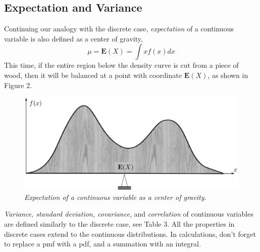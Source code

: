 \subsection{Expectation and Variance}

Continuing our analogy with the discrete case, \textit{expectation} of a continuous variable is also defined as a center of gravity,
\begin{equation*}
  \mu = \mathbf{E}(X) = \int xf(x)dx
\end{equation*}
This time, if the entire region below the density curve is cut from a piece of wood, then it will be balanced at a point with coordinate $\mathbf{E}(X)$, as shown in Figure 2.

\begin{figure}[ht]
  \centering
  \includegraphics[width=.5\textwidth]{img/Fig4.3.png}
  \caption{\textit{Expectation of a continuous variable as a center of gravity.}}
\end{figure}

\textit{Variance, standard deviation, covariance}, and \textit{correlation} of continuous variables are defined similarly to the discrete case, see Table 3. All the properties in discrete cases extend to the continuous distributions. In calculations, don't forget to replace a pmf with a pdf, and a summation with an integral.

